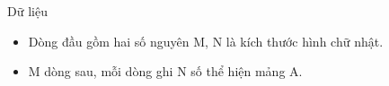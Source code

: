 Dữ liệu  
\begin{itemize}
	\item     Dòng đầu gồm hai số nguyên M, N là kích thước hình chữ nhật.   
	\item     M dòng sau, mỗi dòng ghi N số thể hiện mảng A.   
\end{itemize}